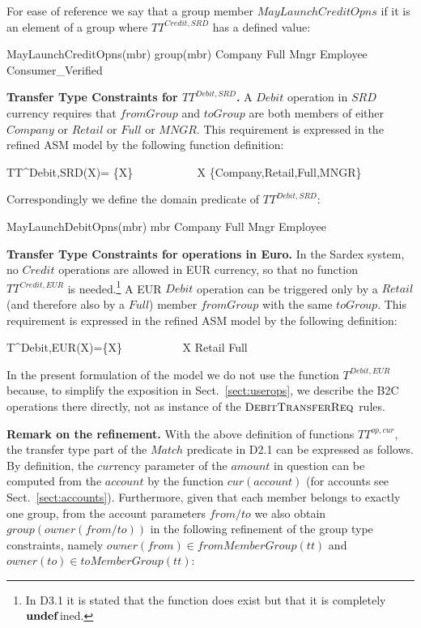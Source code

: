  For ease of reference we say that a group member $MayLaunchCreditOpns$ if it is an element of a group where $TT^{Credit,SRD}$ has a defined value: 
 \begin{asm}
 MayLaunchCreditOpns(mbr) \iff \+
    group(mbr) \in Company \cup Full \cup Mngr \cup Employee \cup Consumer\_Verified
    \end{asm}

\bigskip
{\bf Transfer Type Constraints for $TT^{Debit,SRD}$.} A $Debit$ operation in $SRD$ currency requires that $fromGroup$ and $toGroup$ are both members of either $Company$ or $Retail$ or $Full$ or $MNGR$. This requirement is expressed in the refined ASM model by the following function definition:
	

\begin{asm}
  TT^{Debit,SRD}(X)= \{X\} ~~~~~~~~~~ 
             	\FORALL X \in \{Company,Retail,Full,MNGR\}
\end{asm}

Correspondingly we define the domain predicate of $ TT^{Debit,SRD}$:
 \begin{asm}
MayLaunchDebitOpns(mbr) \iff \+
mbr \in Company \cup Full \cup Mngr \cup Employee 
\end{asm}

\bigskip
{\bf Transfer Type Constraints for operations in Euro.} In the Sardex system, no $Credit$ operations are allowed in EUR currency, so that no function $TT^{Credit,EUR}$ is needed.\footnote{In D3.1 it is stated that the function does exist but that it is completely $\mathrel{\mathbf{undef}}$ined.} A EUR $Debit$ operation can be triggered only by a $Retail$ (and therefore also by a $Full$) member $fromGroup$ with the same $toGroup$. This requirement is expressed in the refined ASM model by the following definition:
\begin{asm}
T^{Debit,EUR}(X)=\{X\} ~~~~~~~~~~\FORALL X \in Retail \cup Full  
\end{asm}

In the present formulation of the model we do not use the function $T^{Debit,EUR}$ because, to simplify the exposition in Sect.~\ref{sect:userops}, we describe the B2C operations there directly, not as instance of the $\hbox{\sc DebitTransferReq}$ rules.

\vspace{12pt}

{\bf Remark on the refinement.} With the above definition of functions $TT^{op,cur}$, the transfer type part of the $Match$ predicate in D2.1 can be expressed as follows. By definition, the $cur$rency parameter of the $amount$ in question can be computed from the $account$ by the function $cur(account)$ (for accounts see Sect.~\ref{sect:accounts}).
Furthermore, given that each member belongs to exactly one group, from the account parameters $from/to$ we also obtain $group(owner(from/to))$ in the following refinement of the group type constraints, namely $owner(from) \in fromMemberGroup(tt) $ and $owner(to) \in toMemberGroup(tt)$: 


